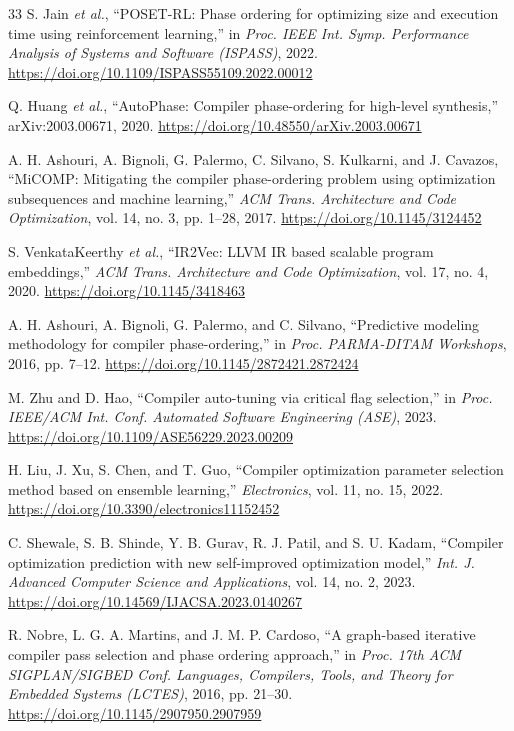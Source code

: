 \documentclass[conference]{IEEEtran}
\begin{document}
\begin{thebibliography}{33}
S. Jain \textit{et al.},
``POSET-RL: Phase ordering for optimizing size and execution time using reinforcement learning,''
in \textit{Proc. IEEE Int. Symp. Performance Analysis of Systems and Software (ISPASS)}, 2022.
\url{https://doi.org/10.1109/ISPASS55109.2022.00012}

Q. Huang \textit{et al.},
``AutoPhase: Compiler phase-ordering for high-level synthesis,'' arXiv:2003.00671, 2020.
\url{https://doi.org/10.48550/arXiv.2003.00671}

A. H. Ashouri, A. Bignoli, G. Palermo, C. Silvano, S. Kulkarni, and J. Cavazos,
``MiCOMP: Mitigating the compiler phase-ordering problem using optimization subsequences and machine learning,''
\textit{ACM Trans. Architecture and Code Optimization}, vol. 14, no. 3, pp. 1--28, 2017.
\url{https://doi.org/10.1145/3124452}

S. VenkataKeerthy \textit{et al.},
``IR2Vec: LLVM IR based scalable program embeddings,''
\textit{ACM Trans. Architecture and Code Optimization}, vol. 17, no. 4, 2020.
\url{https://doi.org/10.1145/3418463}

A. H. Ashouri, A. Bignoli, G. Palermo, and C. Silvano,
``Predictive modeling methodology for compiler phase-ordering,''
in \textit{Proc. PARMA-DITAM Workshops}, 2016, pp. 7--12.
\url{https://doi.org/10.1145/2872421.2872424}

M. Zhu and D. Hao,
``Compiler auto-tuning via critical flag selection,''
in \textit{Proc. IEEE/ACM Int. Conf. Automated Software Engineering (ASE)}, 2023.
\url{https://doi.org/10.1109/ASE56229.2023.00209}

H. Liu, J. Xu, S. Chen, and T. Guo,
``Compiler optimization parameter selection method based on ensemble learning,''
\textit{Electronics}, vol. 11, no. 15, 2022.
\url{https://doi.org/10.3390/electronics11152452}

C. Shewale, S. B. Shinde, Y. B. Gurav, R. J. Patil, and S. U. Kadam,
``Compiler optimization prediction with new self-improved optimization model,''
\textit{Int. J. Advanced Computer Science and Applications}, vol. 14, no. 2, 2023.
\url{https://doi.org/10.14569/IJACSA.2023.0140267}

R. Nobre, L. G. A. Martins, and J. M. P. Cardoso,
``A graph-based iterative compiler pass selection and phase ordering approach,''
in \textit{Proc. 17th ACM SIGPLAN/SIGBED Conf. Languages, Compilers, Tools, and Theory for Embedded Systems (LCTES)}, 2016, pp. 21--30.
\url{https://doi.org/10.1145/2907950.2907959}


\end{thebibliography}
\end{document}
